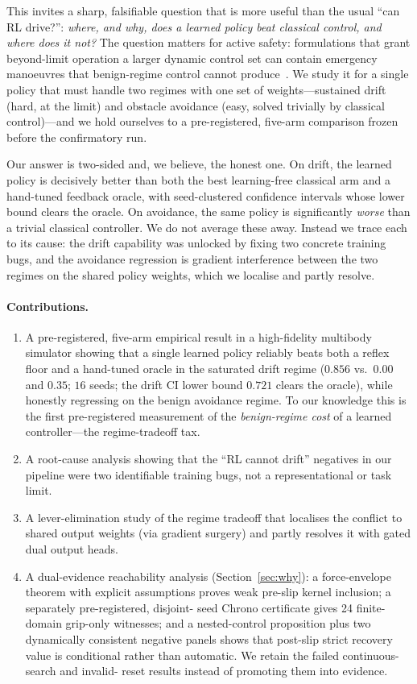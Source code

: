 \documentclass[11pt]{article}
\begin{document}
This invites a sharp, falsifiable question that is more useful than the usual ``can RL drive?'':
\emph{where, and why, does a learned policy beat classical control, and where does it not?} The
question matters for active safety: formulations that grant beyond-limit operation a larger dynamic
control set can contain emergency manoeuvres that benign-regime control cannot
produce~\citep{zhao2022justifying,zhao2024autonomous}. We study it for a single policy
that must handle two regimes with one set of weights---sustained drift (hard, at the limit) and
obstacle avoidance (easy, solved trivially by classical control)---and we hold ourselves to a
pre-registered, five-arm comparison frozen before the confirmatory run.

Our answer is two-sided and, we believe, the honest one. On drift, the learned policy is decisively
better than both the best learning-free classical arm and a hand-tuned feedback oracle, with
seed-clustered confidence intervals whose lower bound clears the oracle. On avoidance, the same
policy is significantly \emph{worse} than a trivial classical controller. We do not average these
away. Instead we trace each to its cause: the drift capability was unlocked by fixing two concrete
training bugs, and the avoidance regression is gradient interference between the two regimes on the
shared policy weights, which we localise and partly resolve.

\paragraph{Contributions.}
\begin{enumerate}
  \item A pre-registered, five-arm empirical result in a high-fidelity multibody simulator showing
  that a single learned policy reliably beats both a reflex floor and a hand-tuned oracle in the
  saturated drift regime ($0.856$ vs.\ $0.00$ and $0.35$; $16$ seeds; the drift CI lower bound
  $0.721$ clears the oracle), while honestly regressing on the benign avoidance regime. To our
  knowledge this is the first pre-registered measurement of the \emph{benign-regime cost} of a
  learned controller---the regime-tradeoff tax.
  \item A root-cause analysis showing that the ``RL cannot drift'' negatives in our pipeline were
  two identifiable training bugs, not a representational or task limit.
  \item A lever-elimination study of the regime tradeoff that localises the conflict to shared
  output weights (via gradient surgery) and partly resolves it with gated dual output heads.
  \item A dual-evidence reachability analysis (Section~\ref{sec:why}): a force-envelope theorem with
  explicit assumptions proves weak pre-slip kernel inclusion; a separately pre-registered, disjoint-
  seed Chrono certificate gives 24 finite-domain grip-only witnesses; and a nested-control
  proposition plus two dynamically consistent negative panels shows that post-slip strict recovery
  value is conditional rather than automatic. We retain the failed continuous-search and invalid-
  reset results instead of promoting them into evidence.
\end{enumerate}
\end{document}
